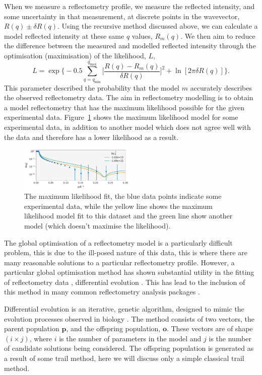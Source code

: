 \documentclass[
 reprint,
 superscriptaddress,
 amsmath,amssymb,
 aps,
]{revtex4-1}
\begin{document}
When we measure a reflectometry profile, we measure the reflected intensity, and some uncertainty in that measurement, at discrete points in the wavevector, $R(q) \pm \delta R(q)$. 
Using the recursive method discussed above, we can calculate a model reflected intensity at these same $q$ values, $R_m(q)$. 
We then aim to reduce the difference between the measured and modelled reflected intensity through the optimisation (maximisation) of the likelihood, $L$, 
%
\begin{equation}
    L = \exp{\bigg\{-0.5 \sum_{q=q_{\text{min}}}^{q_{\text{max}}} \bigg[\frac{R(q) - R_m(q)}{\delta R(q)}\bigg]^2 + \ln[2\pi \delta R(q)]\bigg\}}.
\end{equation}
%
This parameter described the probability that the model $m$ accurately describes the observed reflectometry data. 
The aim in reflectometry modelling is to obtain a model reflectometry that has the maximum likelihood possible for the given experimental data. 
Figure~\ref{fig:likelihood} shows the maximum likelihood model for some experimental data, in addition to another model which does not agree well with the data and therefore has a lower likelihood as a result. 
%
\begin{figure}[t]
    \includegraphics[width=0.49\textwidth]{likelihood}
    \caption{The maximum likelihood fit, the blue data points indicate some experimental data, while the yellow line shows the maximum likelihood model fit to this dataset and the green line show another model (which doesn't maximise the likelihood).}
    \label{fig:likelihood}
\end{figure}
%

The global optimisation of a reflectometry model is a particularly difficult problem, this is due to the ill-posed nature of this data, this is where there are many reasonable solutions to a particular reflectometry profile.
However, a particular global optimisation method has shown substantial utility in the fitting of reflectometry data \cite{varderlee_comparison_2007}, differential evolution \cite{wormington_characterization_1999}.
This has lead to the inclusion of this method in many common reflectometry analysis packages \cite{bjorck_fitting_2011}.

Differential evolution is an iterative, genetic algorithm, designed to mimic the evolution processes observed in biology \cite{holland_adaptation_1992}.
The method consists of two vectors, the parent population $\mathbf{p}$, and the offspring population, $\mathbf{o}$. 
These vectors are of shape $(i \times j)$, where $i$ is the number of parameters in the model and $j$ is the number of candidate solutions being considered. 
The offspring population is generated as a result of some trail method, here we will discuss only a simple classical trail method.
\end{document}
